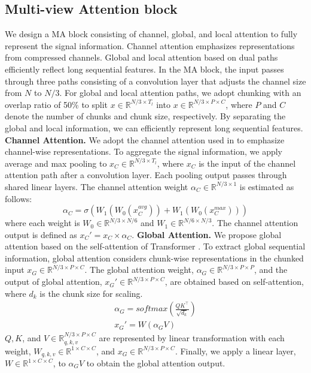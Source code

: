 \documentclass{article}
\begin{document}
\subsection{Multi-view Attention block}
\label{sec:attention}
We design a MA block consisting of channel, global, and local attention to fully represent the signal information. Channel attention emphasizes representations from compressed channels. Global and local attention based on dual paths efficiently reflect long sequential features. In the MA block, the input passes through three paths consisting of a convolution layer that adjusts the channel size from $N$ to $N/3$. For global and local attention paths, we adopt chunking with an overlap ratio of 50\% to split $x \in \mathbb{R}^{N/3 \times T_{l}}$ into $x \in \mathbb{R}^{N/3 \times P \times C}$, where $P$ and $C$ denote the number of chunks and chunk size, respectively. By separating the global and local information, we can efficiently represent long sequential features. \\
\noindent \textbf{Channel Attention.} We adopt the channel attention used in \cite{woo2018cbam} to emphasize channel-wise representations. To aggregate the signal information, we apply average and max pooling to $x_{C} \in \mathbb{R}^{N/3 \times T_{l}}$, where $x_{C}$ is the input of the channel attention path after a convolution layer. Each pooling output passes through shared linear layers. The channel attention weight $\alpha_{C} \in \mathbb{R}^{N/3 \times 1}$ is estimated as follows:
\begin{equation}
\alpha_{C}= \sigma(W_{1}(W_{0}(x_{C}^{avg})) + W_{1}(W_{0}(x_{C}^{max})))
\label{eq:channel attention}
\end{equation}
\noindent where each weight is $W_{0}\in \mathbb{R}^{N/3 \times N/6}$ and $W_{1}\in \mathbb{R}^{N/6 \times N/3}$. The channel attention output is defined as $x_{C}'=x_{C} \times \alpha_{C}$.
\noindent \textbf{Global Attention.} We propose global attention based on the self-attention of Transformer \cite{vaswani2017attention}. To extract global sequential information, global attention considers chunk-wise representations in the chunked input $x_{G} \in \mathbb{R}^{N/3 \times P \times C}$. The global attention weight, $\alpha_{G} \in \mathbb{R}^{N/3 \times P \times P}$, and the output of global attention, $x_{G}' \in \mathbb{R}^{N/3 \times P \times C}$, are obtained based on self-attention, where $d_{k}$ is the chunk size for scaling.
\begin{equation}\label{eq:global attention}
  \begin{gathered}
    \alpha_{G}=softmax(\frac{QK^\top}{\sqrt{d_k}}) \\
    x_{G}' = W(\alpha_{G}V)
  \end{gathered}
\end{equation}
\noindent $Q, K$, and $V \in \mathbb{R}_{q,k,v}^{N/3 \times P \times C}$ are represented by linear transformation with each weight, $W_{q,k,v} \in \mathbb{R}^{1 \times C \times C}$, and $x_{G} \in \mathbb{R}^{N/3 \times P \times C}$. Finally, we apply a linear layer, $W\in \mathbb{R}^{1 \times C \times C}$, to $\alpha_{G}V$ to obtain the global attention output.
\end{document}
